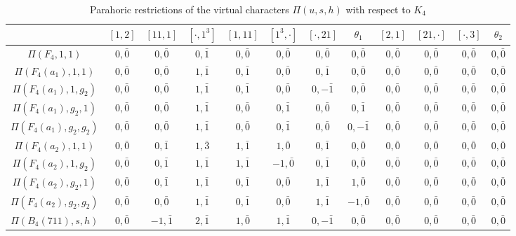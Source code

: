    \begin{table}[!ht]
        \centering
        \caption{Parahoric restrictions of the virtual characters $\Pi(u,s,h)$ with respect to $K_4$} \label{tbl:F4_K4}
        \begin{adjustbox}{max width=\linewidth}
        \begin{tabular}{|c|ccc|cccc|cccc|}
        \hline
        & $[1,2]$ & $[11,1]$ & $[\cdot,1^3]$ & $[1,11]$ & $[1^3,\cdot]$ & $[\cdot,21]$ & $\theta_1$ & $[2,1]$ & $[21,\cdot]$ & $[\cdot,3]$ & $\theta_2$ \\\hline
        $\Pi(F_4,1,1)$ & $0,\bar0$ & $0,\bar0$ & $0,\bar1$ & $0,\bar0$ & $0,\bar0$ & $0,\bar0$ & $0,\bar0$ & $0,\bar0$ & $0,\bar0$ & $0,\bar0$ & $0,\bar0$ \\\hline 
        $\Pi(F_4(a_1),1,1)$ & $0,\bar0$ & $0,\bar0$ & $1,\bar1$ & $0,\bar1$ & $0,\bar0$ & $0,\bar1$ & $0,\bar0$ & $0,\bar0$ & $0,\bar0$ & $0,\bar0$ & $0,\bar0$ \\
        $\Pi(F_4(a_1),1,g_2)$ & $0,\bar0$ & $0,\bar0$ & $1,\bar1$ & $0,\bar1$ & $0,\bar0$ & $0,-\bar1$ & $0,\bar0$ & $0,\bar0$ & $0,\bar0$ & $0,\bar0$ & $0,\bar0$ \\
        $\Pi(F_4(a_1),g_2,1)$ & $0,\bar0$ & $0,\bar0$ & $1,\bar1$ & $0,\bar0$ & $0,\bar1$ & $0,\bar0$ & $0,\bar1$ & $0,\bar0$ & $0,\bar0$ & $0,\bar0$ & $0,\bar0$ \\
        $\Pi(F_4(a_1),g_2,g_2)$ & $0,\bar0$ & $0,\bar0$ & $1,\bar1$ & $0,\bar0$ & $0,\bar1$ & $0,\bar0$ & $0,-\bar1$ & $0,\bar0$ & $0,\bar0$ & $0,\bar0$ & $0,\bar0$ \\\hline
        $\Pi(F_4(a_2),1,1)$ & $0,\bar0$ & $0,\bar1$ & $1,\bar3$ & $1,\bar1$ & $1,\bar0$ & $0,\bar1$ & $0,\bar0$ & $0,\bar0$ & $0,\bar0$ & $0,\bar0$ & $0,\bar0$ \\
        $\Pi(F_4(a_2),1,g_2)$ & $0,\bar0$ & $0,\bar1$ & $1,\bar1$ & $1,\bar1$ & $-1,\bar0$ & $0,\bar1$ & $0,\bar0$ & $0,\bar0$ & $0,\bar0$ & $0,\bar0$ & $0,\bar0$ \\
        $\Pi(F_4(a_2),g_2,1)$ & $0,\bar0$ & $0,\bar1$ & $1,\bar1$ & $0,\bar1$ & $0,\bar0$ & $1,\bar1$ & $1,\bar0$ & $0,\bar0$ & $0,\bar0$ & $0,\bar0$ & $0,\bar0$ \\
        $\Pi(F_4(a_2),g_2,g_2)$ & $0,\bar0$ & $0,\bar0$ & $1,\bar1$ & $0,\bar1$ & $0,\bar0$ & $1,\bar1$ & $-1,\bar0$ & $0,\bar0$ & $0,\bar0$ & $0,\bar0$ & $0,\bar0$ \\\hline
        $\Pi(B_4(711),s,h)$ & $0,\bar0$ & $-1,\bar1$ & $2,\bar1$ & $1,\bar0$ & $1,\bar1$ & $0,-\bar1$ & $0,\bar0$ & $0,\bar0$ & $0,\bar0$ & $0,\bar0$ & $0,\bar0$ \\\hline

\end{tabular}
\end{adjustbox}
\end{table}
